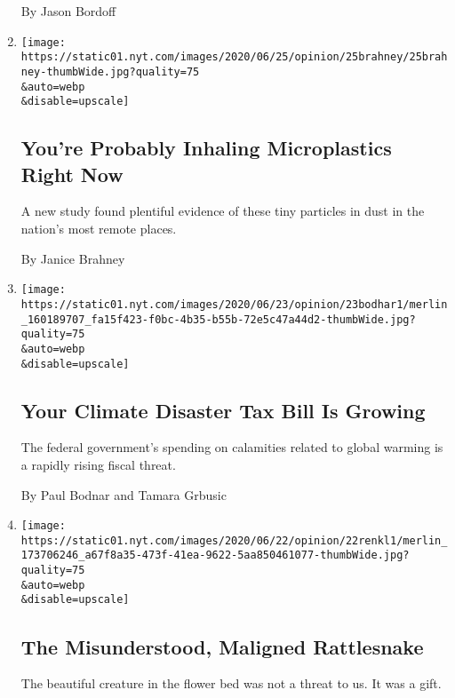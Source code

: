 \begin{enumerate}
  By Jason Bordoff
\item
  \href{/2020/06/25/opinion/plastic-air-pollution.html}{}

  \texttt{[image: https://static01.nyt.com/images/2020/06/25/opinion/25brahney/25brahney-thumbWide.jpg?quality=75\\\&auto=webp\\\&disable=upscale]}

  \hypertarget{youre-probably-inhaling-microplastics-right-now}{%
  \subsection{You're Probably Inhaling Microplastics Right
  Now}\label{youre-probably-inhaling-microplastics-right-now}}

  A new study found plentiful evidence of these tiny particles in dust
  in the nation's most remote places.

  By Janice Brahney
\item
  \href{/2020/06/23/opinion/climate-change-financial-disaster.html}{}

  \texttt{[image: https://static01.nyt.com/images/2020/06/23/opinion/23bodhar1/merlin\_160189707\_fa15f423-f0bc-4b35-b55b-72e5c47a44d2-thumbWide.jpg?quality=75\\\&auto=webp\\\&disable=upscale]}

  \hypertarget{your-climate-disaster-tax-bill-is-growing}{%
  \subsection{Your Climate Disaster Tax Bill Is
  Growing}\label{your-climate-disaster-tax-bill-is-growing}}

  The federal government's spending on calamities related to global
  warming is a rapidly rising fiscal threat.

  By Paul Bodnar and Tamara Grbusic
\item
  \href{/2020/06/22/opinion/rattlesnakes.html}{}

  \texttt{[image: https://static01.nyt.com/images/2020/06/22/opinion/22renkl1/merlin\_173706246\_a67f8a35-473f-41ea-9622-5aa850461077-thumbWide.jpg?quality=75\\\&auto=webp\\\&disable=upscale]}

  \hypertarget{the-misunderstood-maligned-rattlesnake}{%
  \subsection{The Misunderstood, Maligned
  Rattlesnake}\label{the-misunderstood-maligned-rattlesnake}}

  The beautiful creature in the flower bed was not a threat to us. It
  was a gift.


\end{enumerate}
